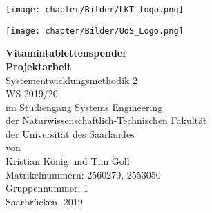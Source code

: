\documentclass[a4paper,12pt, headings=small, bibtotoc, numbers=noenddot]{scrreprt} %
\begin{document}
\pagestyle{empty}   %


\label{Coversheet}
\begin{minipage}{0.5\textwidth}
\begin{flushleft}
\texttt{[image: chapter/Bilder/LKT\_logo.png]}
\end{flushleft}
\end{minipage}
\begin{minipage}{0.5\textwidth}
\begin{flushright}
\texttt{[image: chapter/Bilder/UdS\_Logo.png]}
\end{flushright}
\end{minipage}
\headrule

\vspace{1.5cm}

\begin{center}
\LARGE \textbf{Vitamintablettenspender}\\ 
\vspace{3cm}
\textbf{Projektarbeit} \\
\Large Systementwicklungsmethodik 2\\ 
WS 2019/20\\
im Studiengang Systems Engineering\\
der Naturwissenschaftlich-Technischen Fakultät \\
der Universität des Saarlandes\\
\vspace{2.5cm}
\Large von\\
\vspace{1cm}
Kristian König und Tim Goll\\
Matrikelnummern: 2560270, 2553050 \\
Gruppennummer: 1\\
\vspace{1cm}
Saarbrücken, 2019
\end{center}
\newpage 

\thispagestyle{empty}
\quad 
\newpage

\label{Aufgabenstellung}
 
\newpage
\end{document}
